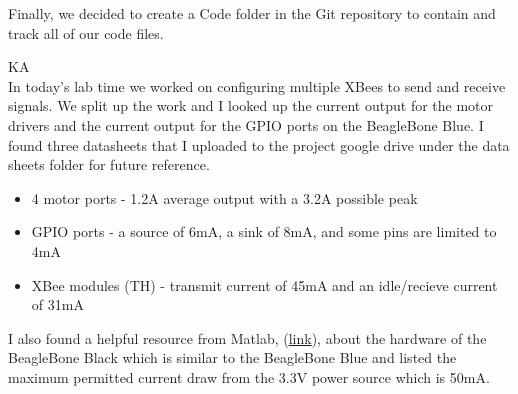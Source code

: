 \documentclass[fontsize=11pt, %
                             paper=letter, %
                             openany, %
                             captions=tableheading,
                             index=totoc,
                             hyperref]{labbook}
\begin{document}
\begin{addmargin}[0cm]{0cm}
Finally, we decided to create a Code folder in the Git repository to contain and track all of our code files.

KA\\
In today's lab time we worked on configuring multiple XBees to send and receive signals. We split up the work and I looked up the current output for the motor drivers and the current output for the GPIO ports on the BeagleBone Blue. I found three datasheets that I uploaded to the project google drive under the data sheets folder for future reference.

\begin{itemize}
    \item 4 motor ports - 1.2A average output with a 3.2A possible peak
    \item GPIO ports - a source of 6mA, a sink of 8mA, and some pins are limited to 4mA
    \item XBee modules (TH) - transmit current of 45mA and an idle/recieve current of 31mA
\end{itemize}

I also found a helpful resource from Matlab, (\href{https://www.mathworks.com/help/supportpkg/beagleboneio/examples/working-with-beaglebone-black-hardware.html}{link}), about the hardware of the BeagleBone Black which is similar to the BeagleBone Blue and listed the maximum permitted current draw from the 3.3V power source which is 50mA.


\end{addmargin}











\end{document}
